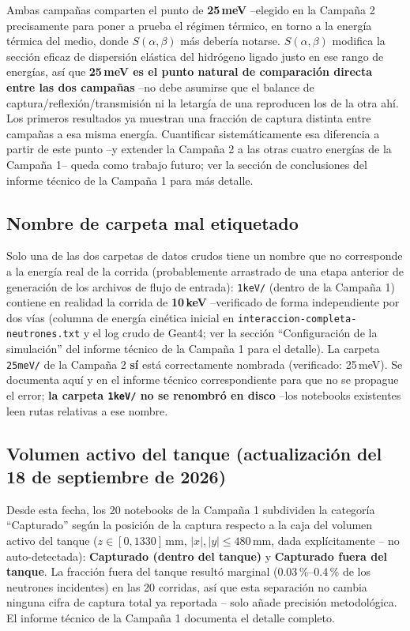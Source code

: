 \documentclass[11pt,a4paper]{article}
\newcommand{\codigo}[1]{\nolinkurl{#1}}
\begin{document}
Ambas campañas comparten el punto de \textbf{25\,meV} --elegido en la Campaña 2 precisamente para
poner a prueba el régimen térmico, en torno a la energía térmica del medio, donde $S(\alpha,\beta)$
más debería notarse. $S(\alpha,\beta)$ modifica la sección eficaz de dispersión elástica del
hidrógeno ligado justo en ese rango de energías, así que \textbf{25\,meV es el punto natural de
comparación directa entre las dos campañas} --no debe asumirse que el balance de
captura/reflexión/transmisión ni la letargía de una reproducen los de la otra ahí. Los primeros
resultados ya muestran una fracción de captura distinta entre campañas a esa misma energía.
Cuantificar sistemáticamente esa diferencia a partir de este punto --y extender la Campaña 2 a las
otras cuatro energías de la Campaña 1-- queda como trabajo futuro; ver la sección de conclusiones
del informe técnico de la Campaña 1 para más detalle.

\subsection{Nombre de carpeta mal etiquetado}

Solo una de las dos carpetas de datos crudos tiene un nombre que no corresponde a la energía real de
la corrida (probablemente arrastrado de una etapa anterior de generación de los archivos de flujo de
entrada): \codigo{1keV/} (dentro de la Campaña 1) contiene en realidad la corrida de \textbf{10\,keV}
--verificado de forma independiente por dos vías (columna de energía cinética inicial en
\codigo{interaccion-completa-neutrones.txt} y el log crudo de Geant4; ver la sección
``Configuración de la simulación'' del informe técnico de la Campaña 1 para el detalle). La carpeta
\codigo{25meV/} de la Campaña 2 \textbf{sí} está correctamente nombrada (verificado: 25\,meV). Se
documenta aquí y en el informe técnico correspondiente para que no se propague el error;
\textbf{la carpeta \codigo{1keV/} no se renombró en disco} --los notebooks existentes leen rutas
relativas a ese nombre.

\subsection{Volumen activo del tanque (actualización del 18 de septiembre de 2026)}

Desde esta fecha, los 20 notebooks de la Campaña 1 subdividen la categoría ``Capturado'' según la
posición de la captura respecto a la caja del volumen activo del tanque
($z\in[0,1330]\,\text{mm}$, $|x|,|y|\leq480\,\text{mm}$, dada explícitamente -- no auto-detectada):
\textbf{Capturado (dentro del tanque)} y \textbf{Capturado fuera del tanque}. La fracción fuera del
tanque resultó marginal (0.03\,\%--0.4\,\% de los neutrones incidentes) en las 20 corridas, así que
esta separación no cambia ninguna cifra de captura total ya reportada -- solo añade precisión
metodológica. El informe técnico de la Campaña 1 documenta el detalle completo.
\end{document}
